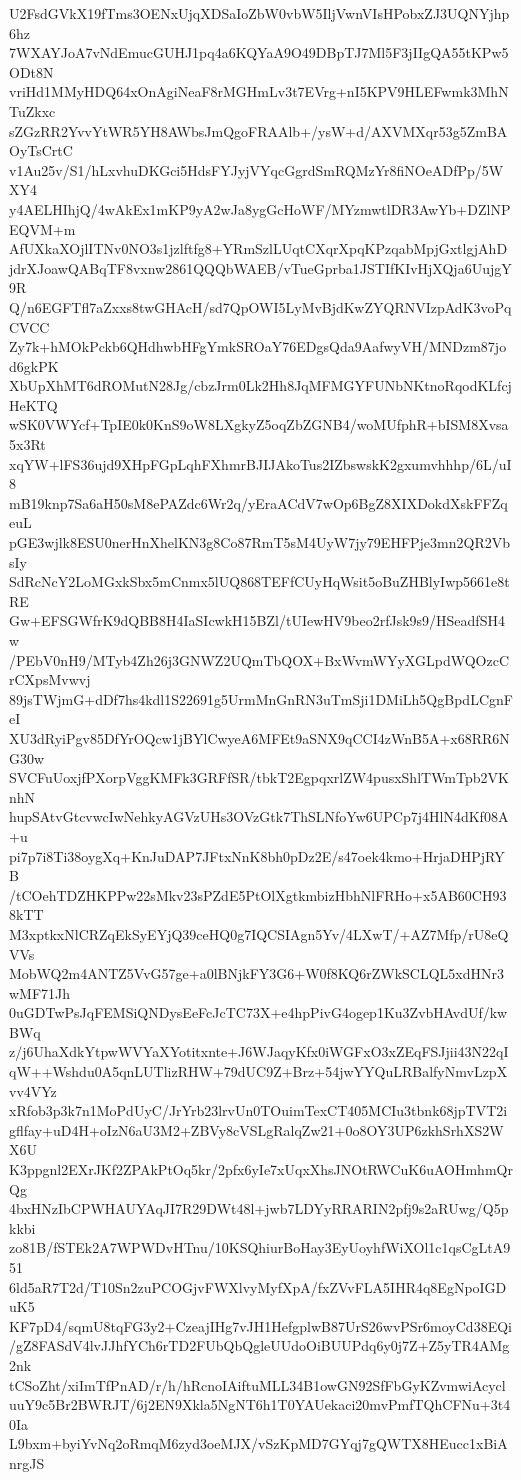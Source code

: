 U2FsdGVkX19fTms3OENxUjqXDSaIoZbW0vbW5IljVwnVIsHPobxZJ3UQNYjhp6hz
7WXAYJoA7vNdEmucGUHJ1pq4a6KQYaA9O49DBpTJ7Ml5F3jIIgQA55tKPw5ODt8N
vriHd1MMyHDQ64xOnAgiNeaF8rMGHmLv3t7EVrg+nI5KPV9HLEFwmk3MhNTuZkxc
sZGzRR2YvvYtWR5YH8AWbsJmQgoFRAAlb+/ysW+d/AXVMXqr53g5ZmBAOyTsCrtC
v1Au25v/S1/hLxvhuDKGci5HdsFYJyjVYqcGgrdSmRQMzYr8fiNOeADfPp/5WXY4
y4AELHIhjQ/4wAkEx1mKP9yA2wJa8ygGcHoWF/MYzmwtlDR3AwYb+DZlNPEQVM+m
AfUXkaXOjlITNv0NO3s1jzlftfg8+YRmSzlLUqtCXqrXpqKPzqabMpjGxtlgjAhD
jdrXJoawQABqTF8vxnw2861QQQbWAEB/vTueGprba1JSTIfKIvHjXQja6UujgY9R
Q/n6EGFTfl7aZxxs8twGHAcH/sd7QpOWI5LyMvBjdKwZYQRNVIzpAdK3voPqCVCC
Zy7k+hMOkPckb6QHdhwbHFgYmkSROaY76EDgsQda9AafwyVH/MNDzm87jod6gkPK
XbUpXhMT6dROMutN28Jg/cbzJrm0Lk2Hh8JqMFMGYFUNbNKtnoRqodKLfcjHeKTQ
wSK0VWYcf+TpIE0k0KnS9oW8LXgkyZ5oqZbZGNB4/woMUfphR+bISM8Xvsa5x3Rt
xqYW+lFS36ujd9XHpFGpLqhFXhmrBJIJAkoTus2IZbswskK2gxumvhhhp/6L/uI8
mB19knp7Sa6aH50sM8ePAZdc6Wr2q/yEraACdV7wOp6BgZ8XIXDokdXskFFZqeuL
pGE3wjlk8ESU0nerHnXhelKN3g8Co87RmT5sM4UyW7jy79EHFPje3mn2QR2VbsIy
SdRcNcY2LoMGxkSbx5mCnmx5lUQ868TEFfCUyHqWsit5oBuZHBlyIwp5661e8tRE
Gw+EFSGWfrK9dQBB8H4IaSIcwkH15BZl/tUIewHV9beo2rfJsk9s9/HSeadfSH4w
/PEbV0nH9/MTyb4Zh26j3GNWZ2UQmTbQOX+BxWvmWYyXGLpdWQOzcCrCXpsMvwvj
89jsTWjmG+dDf7hs4kdl1S22691g5UrmMnGnRN3uTmSji1DMiLh5QgBpdLCgnFeI
XU3dRyiPgv85DfYrOQcw1jBYlCwyeA6MFEt9aSNX9qCCI4zWnB5A+x68RR6NG30w
SVCFuUoxjfPXorpVggKMFk3GRFfSR/tbkT2EgpqxrlZW4pusxShlTWmTpb2VKnhN
hupSAtvGtcvwcIwNehkyAGVzUHs3OVzGtk7ThSLNfoYw6UPCp7j4HlN4dKf08A+u
pi7p7i8Ti38oygXq+KnJuDAP7JFtxNnK8bh0pDz2E/s47oek4kmo+HrjaDHPjRYB
/tCOehTDZHKPPw22sMkv23sPZdE5PtOlXgtkmbizHbhNlFRHo+x5AB60CH938kTT
M3xptkxNlCRZqEkSyEYjQ39ceHQ0g7IQCSIAgn5Yv/4LXwT/+AZ7Mfp/rU8eQVVs
MobWQ2m4ANTZ5VvG57ge+a0lBNjkFY3G6+W0f8KQ6rZWkSCLQL5xdHNr3wMF71Jh
0uGDTwPsJqFEMSiQNDysEeFcJcTC73X+e4hpPivG4ogep1Ku3ZvbHAvdUf/kwBWq
z/j6UhaXdkYtpwWVYaXYotitxnte+J6WJaqyKfx0iWGFxO3xZEqFSJjii43N22qI
qW++Wshdu0A5qnLUTlizRHW+79dUC9Z+Brz+54jwYYQuLRBalfyNmvLzpXvv4VYz
xRfob3p3k7n1MoPdUyC/JrYrb23lrvUn0TOuimTexCT405MCIu3tbnk68jpTVT2i
gflfay+uD4H+oIzN6aU3M2+ZBVy8cVSLgRalqZw21+0o8OY3UP6zkhSrhXS2WX6U
K3ppgnl2EXrJKf2ZPAkPtOq5kr/2pfx6yIe7xUqxXhsJNOtRWCuK6uAOHmhmQrQg
4bxHNzIbCPWHAUYAqJI7R29DWt48l+jwb7LDYyRRARIN2pfj9s2aRUwg/Q5pkkbi
zo81B/fSTEk2A7WPWDvHTnu/10KSQhiurBoHay3EyUoyhfWiXOl1c1qsCgLtA951
6ld5aR7T2d/T10Sn2zuPCOGjvFWXlvyMyfXpA/fxZVvFLA5IHR4q8EgNpoIGDuK5
KF7pD4/sqmU8tqFG3y2+CzeajIHg7vJH1HefgplwB87UrS26wvPSr6moyCd38EQi
/gZ8FASdV4lvJJhfYCh6rTD2FUbQbQgleUUdoOiBUUPdq6y0j7Z+Z5yTR4AMg2nk
tCSoZht/xiImTfPnAD/r/h/hRcnoIAiftuMLL34B1owGN92SfFbGyKZvmwiAcycl
uuY9c5Br2BWRJT/6j2EN9Xkla5NgNT6h1T0YAUekaci20mvPmfTQhCFNu+3t40Ia
L9bxm+byiYvNq2oRmqM6zyd3oeMJX/vSzKpMD7GYqj7gQWTX8HEucc1xBiAnrgJS
